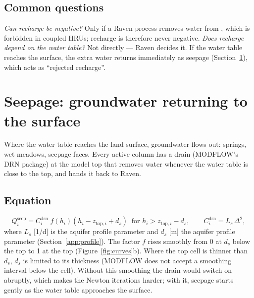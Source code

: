 \subsection{Common questions}
\textit{Can recharge be negative?} Only if a Raven process removes water from , which is forbidden in coupled
HRUs; recharge is therefore never negative. \textit{Does recharge depend on the water table?} Not directly --- Raven decides
it. If the water table reaches the surface, the extra water returns immediately as seepage (Section~\ref{ch:seepage}), which
acts as ``rejected recharge''.

\section{Seepage: groundwater returning to the surface}\label{ch:seepage}
Where the water table reaches the land surface, groundwater flows out: springs, wet meadows, seepage faces. Every active
column has a drain (MODFLOW's DRN package) at the model top that removes water whenever the water table is close to
the top, and hands it back to Raven.

\subsection{Equation}
\begin{equation}
Q^{\mathrm{seep}}_i=C^{\mathrm{drn}}_i\;f\!\left(h_i\right)\left(h_i-z_{\mathrm{top},i}+d_s\right)\ \text{ for } h_i>z_{\mathrm{top},i}-d_s,
\qquad C^{\mathrm{drn}}_i=L_s\,\Delta^2 ,
\end{equation}
where $L_s$ [1/d] is the aquifer profile parameter  and $d_s$ [m] the aquifer profile parameter  (Section~\ref{app:profile}).
The factor $f$ rises smoothly from 0 at $d_s$ below the top to 1 at the top (Figure~\ref{fig:curves}b). Where the top cell is
thinner than $d_s$, $d_s$ is limited to its thickness (MODFLOW does not accept a smoothing interval below the cell). Without this
smoothing the drain would switch on abruptly, which makes the Newton iterations harder; with it, seepage starts gently
as the water table approaches the surface.

